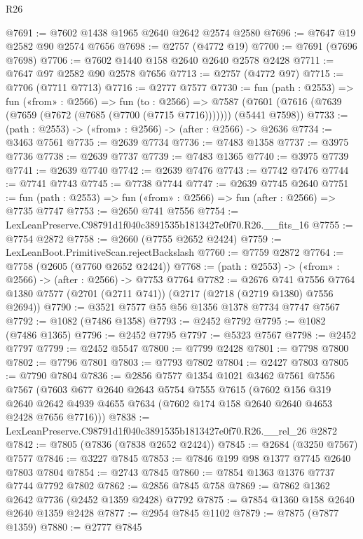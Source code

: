 \begin{lexlean}{R26}
\begin{coremodule}
@7691 := @7602 @1438 @1965 @2640 @2642 @2574 @2580
@7696 := @7647 @19 @2582 @90 @2574 @7656
@7698 := @2757 (@4772 @19)
@7700 := @7691 (@7696 @7698)
@7706 := @7602 @1440 @158 @2640 @2640 @2578 @2428
@7711 := @7647 @97 @2582 @90 @2578 @7656
@7713 := @2757 (@4772 @97)
@7715 := @7706 (@7711 @7713)
@7716 := @2777 @7577
@7730 := fun (path : @2553) =>
  fun («from» : @2566) =>
  fun (to : @2566) =>
  @7587 (@7601 (@7616 (@7639 (@7659 (@7672 (@7685 (@7700 (@7715 @7716))))))) (@5441 @7598))
@7733 := (path : @2553) -> («from» : @2566) -> (after : @2566) -> @2636
@7734 := @3463 @7561
@7735 := @2639 @7734
@7736 := @7483 @1358
@7737 := @3975 @7736
@7738 := @2639 @7737
@7739 := @7483 @1365
@7740 := @3975 @7739
@7741 := @2639 @7740
@7742 := @2639 @7476
@7743 := @7742 @7476
@7744 := @7741 @7743
@7745 := @7738 @7744
@7747 := @2639 @7745 @2640
@7751 := fun (path : @2553) => fun («from» : @2566) => fun (after : @2566) => @7735 @7747
@7753 := @2650 @741 @7556
@7754 := LexLeanPreserve.C98791d1f040c3891535b1813427e0f70.R26.__fits_16
@7755 := @7754 @2872
@7758 := @2660 (@7755 @2652 @2424)
@7759 := LexLeanBoot.PrimitiveScan.rejectBackslash
@7760 := @7759 @2872
@7764 := @7758 (@2605 (@7760 @2652 @2424))
@7768 := (path : @2553) -> («from» : @2566) -> (after : @2566) -> @7753 @7764
@7782 := @2676
    @741
    @7556
    @7764
    @1380
    @7577
    (@2701 (@2711 @741))
    (@2717 (@2718 (@2719 @1380) @7556 @2694))
@7790 := @3521 @7577 @55 @56 @1356 @1378 @7734 @7747 @7567
@7792 := @1082 (@7486 @1358)
@7793 := @2452 @7792
@7795 := @1082 (@7486 @1365)
@7796 := @2452 @7795
@7797 := @5323 @7567
@7798 := @2452 @7797
@7799 := @2452 @5547
@7800 := @7799 @2428
@7801 := @7798 @7800
@7802 := @7796 @7801
@7803 := @7793 @7802
@7804 := @2427 @7803
@7805 := @7790 @7804
@7836 := @2856
    @7577
    @1354
    @1021
    @3462
    @7561
    @7556
    @7567
    (@7603
      @677
      @2640
      @2643
      @5754
      @7555
      @7615
      (@7602
        @156
        @319
        @2640
        @2642
        @4939
        @4655
        @7634
        (@7602 @174 @158 @2640 @2640 @4653 @2428 @7656 @7716)))
@7838 := LexLeanPreserve.C98791d1f040c3891535b1813427e0f70.R26.__rel_26 @2872
@7842 := @7805 (@7836 (@7838 @2652 @2424))
@7845 := @2684 (@3250 @7567) @7577
@7846 := @3227 @7845
@7853 := @7846 @199 @98 @1377 @7745 @2640 @7803 @7804
@7854 := @2743 @7845
@7860 := @7854 @1363 @1376 @7737 @7744 @7792 @7802
@7862 := @2856 @7845 @758
@7869 := @7862 @1362 @2642 @7736 (@2452 @1359 @2428) @7792
@7875 := @7854 @1360 @158 @2640 @2640 @1359 @2428
@7877 := @2954 @7845 @1102
@7879 := @7875 (@7877 @1359)
@7880 := @2777 @7845

\end{coremodule}
\end{lexlean}
